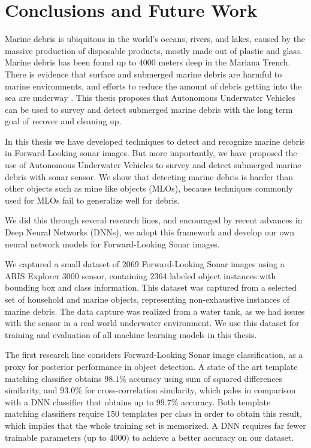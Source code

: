 \chapter{Conclusions and Future Work}
\label{chapter:conclusions}
Marine debris is ubiquitous in the world's oceans, rivers, and lakes, caused by the massive production of disposable products, mostly made out of plastic and glass. Marine debris has been found up to 4000 meters deep in the Mariana Trench.  There is evidence that surface and submerged marine debris \cite{iniguez2016marine} are harmful to marine environments, and efforts to reduce the amount of debris getting into the sea are underway \cite[1em]{mcilgorm2008understanding}. This thesis proposes that Autonomous Underwater Vehicles can be used to survey and detect submerged marine debris with the long term goal of recover and cleaning up.

In this thesis we have developed techniques to detect and recognize marine debris in Forward-Looking sonar images. But more importantly, we have proposed the use of Autonomous Underwater Vehicles to survey and detect submerged marine debris with sonar sensor. We show that detecting marine debris is harder than other objects such as mine like objects (MLOs), because techniques commonly used for MLOs fail to generalize well for debris.

We did this through several research lines, and encouraged by recent advances in Deep Neural Networks (DNNs), we adopt this framework and develop our own neural network models for Forward-Looking Sonar images.

We captured a small dataset of 2069 Forward-Looking Sonar images using a ARIS Explorer 3000 sensor, containing 2364 labeled object instances with bounding box and class information. This dataset was captured from a selected set of household and marine objects, representing non-exhaustive instances of marine debris. The data capture was realized from a water tank, as we had issues with the sensor in a real world underwater environment. We use this dataset for training and evaluation of all machine learning models in this thesis.

The first research line considers Forward-Looking Sonar image classification, as a proxy for posterior performance in object detection. A state of the art template matching classifier obtains $98.1 \%$ accuracy using sum of squared differences similarity, and $93.0 \%$ for cross-correlation similarity, which pales in comparison with a DNN classifier that obtains up to $99.7 \%$ accuracy. Both template matching classifiers require 150 templates per class in order to obtain this result, which implies that the whole training set is memorized. A DNN requires far fewer trainable parameters (up to 4000) to achieve a better accuracy on our dataset.

